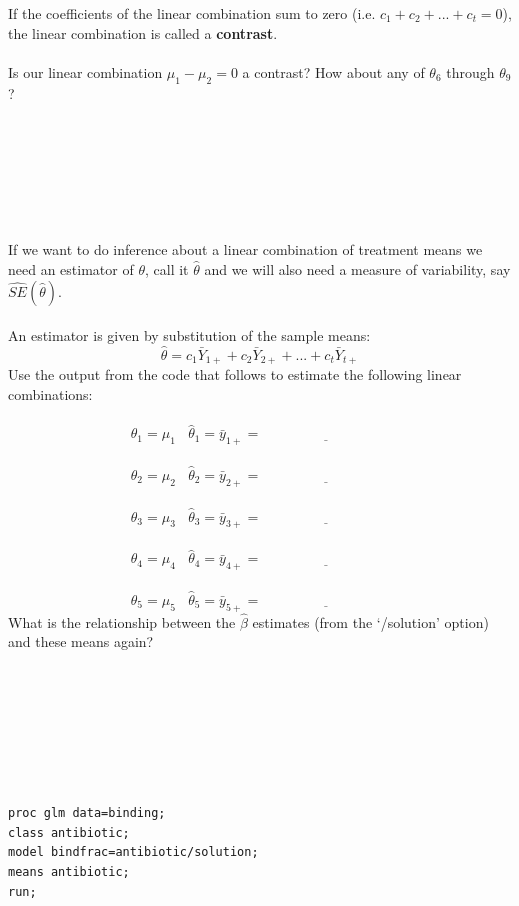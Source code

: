 If the coefficients of the linear combination sum to zero (i.e. $c_1+c_2+...+c_t=0$), the linear combination is called a \textbf{contrast}.\\~\\
Is our linear combination $\mu_1-\mu_2=0$ a contrast?  How about any of $\theta_6$ through $\theta_9$?\\~\\~\\~\\~\\~\\~\\~\\
If we want to do inference about a linear combination of treatment means we need an estimator of $\theta$, call it $\hat{\theta}$ and we will also need a measure of variability, say $\hat{SE}(\hat{\theta})$.\\~\\
An estimator is given by substitution of the sample means: 
    $$\hat{\theta}=c_{1}\bar{Y}_{1+}+c_{2}\bar{Y}_{2+}+...+c_{t}\bar{Y}_{t+}$$
 Use the output from the code that follows to estimate the following linear combinations:  \\~\\
    $$\theta_1=\mu_1~~~~\hat{\theta}_1=\bar{y}_{1+}=\underline{~~~~~~~~~~~~~~~~~~~~~~~~~~~~~~~~~~~~~~~~~}$$~\\
    $$\theta_2=\mu_2~~~~\hat{\theta}_2=\bar{y}_{2+}=\underline{~~~~~~~~~~~~~~~~~~~~~~~~~~~~~~~~~~~~~~~~~}$$~\\
    $$\theta_3=\mu_3~~~~\hat{\theta}_3=\bar{y}_{3+}=\underline{~~~~~~~~~~~~~~~~~~~~~~~~~~~~~~~~~~~~~~~~~}$$~\\
    $$\theta_4=\mu_4~~~~\hat{\theta}_4=\bar{y}_{4+}=\underline{~~~~~~~~~~~~~~~~~~~~~~~~~~~~~~~~~~~~~~~~~}$$~\\
    $$\theta_5=\mu_5~~~~\hat{\theta}_5=\bar{y}_{5+}=\underline{~~~~~~~~~~~~~~~~~~~~~~~~~~~~~~~~~~~~~~~~~}$$
What is the relationship between the $\hat{\beta}$ estimates (from the `/solution' option) and these means again?\\~\\~\\~\\~\\~\\~\\~\\
\begin{small}
\begin{verbatim}
proc glm data=binding;
class antibiotic;
model bindfrac=antibiotic/solution;
means antibiotic;
run;
\end{verbatim}
\end{small}
